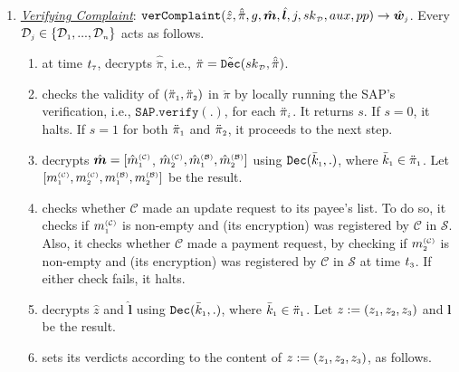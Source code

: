 \begin{enumerate}[leftmargin=.46cm]


\item\label{VerifyingComplaint}  \underline{\textit{Verifying Complaint}}: $\mathtt{verComplaint}(\hat z, \hat{\ddot{\pi}}, g, \hat {\bm m}, \hat{\bm{l}},  j, {sk}_{\scriptscriptstyle\mathcal {D}}, aux, pp)\rightarrow \hat{\bm w}_{\scriptscriptstyle j}$.
%
Every $\mathcal{D}_{\scriptscriptstyle j}\in\{\mathcal{D}_{\scriptscriptstyle 1}, ..., \mathcal{D}_{\scriptscriptstyle n}\}$ acts as follows.
\begin{enumerate}

%
\item at time $t_{\scriptscriptstyle 7}$, decrypts $\hat{\ddot{\pi}}$, i.e., ${\ddot{\pi}}={\tilde{\mathtt {Dec}}}({sk}_{\scriptscriptstyle\mathcal {D}}, \hat{\ddot \pi})$. 

\item checks the validity  of $(\ddot{\pi}_{\scriptscriptstyle 1}, \ddot{\pi}_{\scriptscriptstyle 2})$ in $\ddot{\pi}$ by locally running  the SAP's verification, i.e., $\mathtt{SAP.verify}(.)$, for each  $\ddot{\pi}_{\scriptscriptstyle i}$. It   returns  $s$. If $s=0$, it halts. If $s=1$ for both $\ddot{\pi}_{\scriptscriptstyle 1}$ and  $\ddot{\pi}_{\scriptscriptstyle 2}$, it proceeds to the next step. 
%
\item decrypts $\hat{\bm m}=[\hat{m}_{\scriptscriptstyle 1}^{\scriptscriptstyle(\mathcal C)}$, $\hat{m}_{\scriptscriptstyle 2}^{\scriptscriptstyle(\mathcal C)}, \hat{m}_{\scriptscriptstyle 1}^{\scriptscriptstyle(\mathcal B)}, \hat{m}_{\scriptscriptstyle 2}^{\scriptscriptstyle(\mathcal B)}]$  using $\mathtt{Dec}(\bar k_{\scriptscriptstyle 1},.)$, where $\bar k_{\scriptscriptstyle 1}\in\ddot \pi_{\scriptscriptstyle 1}$. Let $[{m}_{\scriptscriptstyle 1}^{\scriptscriptstyle(\mathcal C)},  {m}_{\scriptscriptstyle 2}^{\scriptscriptstyle(\mathcal C)},  {m}_{\scriptscriptstyle 1}^{\scriptscriptstyle(\mathcal B)}, {m}_{\scriptscriptstyle 2}^{\scriptscriptstyle(\mathcal B)}]$ be the result. 

\item  checks whether $\mathcal C$ made an update request to its payee's list. To do so, it checks if  $m_{\scriptscriptstyle 1}^{\scriptscriptstyle(\mathcal C)}$  is non-empty and (its encryption) was registered by $\mathcal{C}$ in $\mathcal{S}$. Also, it checks whether $\mathcal C$ made a payment request, by checking if $m_{\scriptscriptstyle 2}^{\scriptscriptstyle(\mathcal C)}$ is non-empty and (its encryption) was registered by $\mathcal{C}$ in $\mathcal{S}$ at time $t_{\scriptscriptstyle 3}$.  If either check fails, it halts. 
\item decrypts $\hat z$ and $\hat{\bm{l}}$ using $\mathtt{Dec}(\bar k_{\scriptscriptstyle 1},.)$, where $\bar k_{\scriptscriptstyle 1}\in\ddot \pi_{\scriptscriptstyle 1}$. Let $ z:=(z_{\scriptscriptstyle 1}, z_{\scriptscriptstyle 2}, z_{\scriptscriptstyle 3})$ and ${\bm{l}}$ be the result. 
%
\item\label{auditors-verdict} sets its verdicts according to  the content of  $z:=(z_{\scriptscriptstyle 1}, z_{\scriptscriptstyle 2}, z_{\scriptscriptstyle 3})$, as follows.  
%
\begin{itemize}


\end{itemize}
\end{enumerate}
\end{enumerate}
